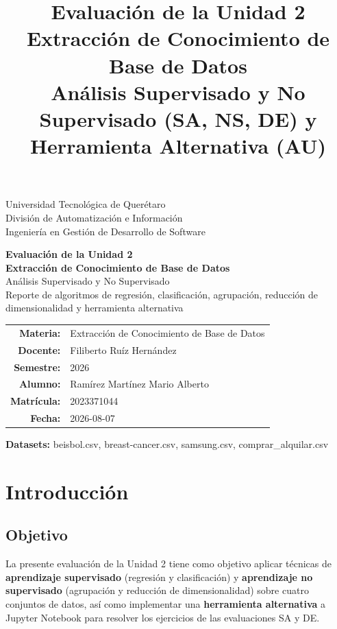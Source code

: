 \documentclass[12pt,a4paper]{article}
\title{\vspace{2.5cm}
{\Huge\textcolor{utedark}{Evaluación de la Unidad 2}}\\[0.4cm]
{\LARGE Extracción de Conocimiento de Base de Datos}\\[1.2cm]
{\large Análisis Supervisado y No Supervisado (SA, NS, DE) y Herramienta Alternativa (AU)}}
\author{}
\date{}
\begin{document}
\thispagestyle{empty}
\begin{center}
\vspace*{0.3cm}

\vspace{0.6cm}
{\Large Universidad Tecnológica de Querétaro}\\[0.2cm]
{\large División de Automatización e Información}\\[0.2cm]
{\large Ingeniería en Gestión de Desarrollo de Software}

\vspace{1.2cm}
{\Huge\bfseries\textcolor{utedark}{Evaluación de la Unidad 2}}\\[0.5cm]
{\LARGE\bfseries Extracción de Conocimiento de Base de Datos}\\[1.0cm]
{\large Análisis Supervisado y No Supervisado}\\[0.3cm]
{\large Reporte de algoritmos de regresión, clasificación, agrupación, reducción de dimensionalidad y herramienta alternativa}

\vspace{1.2cm}
\begin{tabular}{rl}
\textbf{Materia:} & Extracción de Conocimiento de Base de Datos \\
\textbf{Docente:} & Filiberto Ruíz Hernández \\
\textbf{Semestre:} & 2026 \\
\textbf{Alumno:} & Ramírez Martínez Mario Alberto \\
\textbf{Matrícula:} & 2023371044 \\
\textbf{Fecha:} & 2026-08-07 \\
\end{tabular}

\vspace{1.0cm}
{\large\textbf{Datasets:} beisbol.csv, breast-cancer.csv, samsung.csv, comprar\_alquilar.csv}

\end{center}
\newpage

{\hypersetup{linkcolor=utedark}\tableofcontents}
\newpage

\section{Introducción}

\subsection{Objetivo}
La presente evaluación de la Unidad 2 tiene como objetivo aplicar técnicas de
\textbf{aprendizaje supervisado} (regresión y clasificación) y \textbf{aprendizaje no
supervisado} (agrupación y reducción de dimensionalidad) sobre cuatro conjuntos de
datos, así como implementar una \textbf{herramienta alternativa} a Jupyter Notebook
para resolver los ejercicios de las evaluaciones SA y DE.
\end{document}
